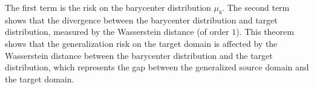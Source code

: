 \documentclass[journal]{IEEEtran}
\begin{document}
The first term is the risk on the barycenter distribution $\mu_b$.
The second term shows that the divergence between the barycenter distribution and target distribution, measured by the Wasserstein distance (of order $1$).
This theorem shows that the generalization risk on the target domain is affected by
the Wasserstein distance between the barycenter distribution and the target distribution, which represents the gap between the generalized source domain and the target domain.
\end{document}

